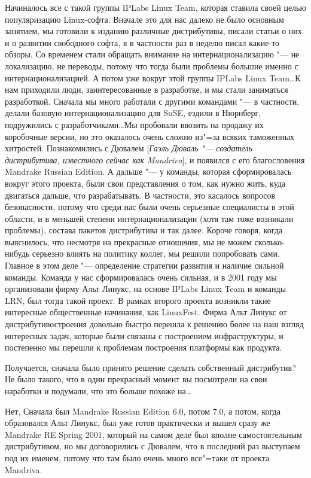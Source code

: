 \documentclass[10pt, a5paper]{article}
\begin{document}
\a Начиналось все с такой группы IPLabs Linux Team, которая ставила своей целью популяризацию Linux-софта. Вначале это для нас далеко не было основным занятием, мы готовили к изданию различные дистрибутивы, писали статьи о них и о развитии свободного софта, я в частности раз в неделю писал какие-то обзоры. Со временем стали обращать внимание на интернационализацию "--- не локализацию, не переводы, потому что тогда были проблемы большие именно с  интернационализацией. А потом уже вокруг этой группы  IPLabs Linux Team\ldots К нам приходили люди, заинтересованные в разработке, и мы стали заниматься разработкой. Сначала мы много работали с другими командами "--- в частности, делали базовую интернационализацию для SuSE, ездили в Нюрнберг, подружились с разработчиками\ldots Мы пробовали ввозить на продажу их коробочные версии, но это оказалось очень сложно из"=за всяких таможенных хитростей. Познакомились с Дювалем [\emph{Гаэль Дюваль "--- создатель дистрибутива, известного сейчас как Mandriva}], и появился с его благословения Mandrake Russian Edition. А дальше "--- у команды, которая сформировалась вокруг этого проекта, были свои представления о том, как нужно жить, куда двигаться дальше, что разрабатывать. В частности, это касалось вопросов безопасности, потому что среди нас были очень серьезные специалисты в этой области, и в меньшей степени интернационализации (хотя там тоже возникали проблемы),  состава пакетов дистрибутива и так далее. Короче говоря, когда выяснилось, что несмотря на прекрасные отношения, мы не можем сколько-нибудь серьезно влиять на политику коллег, мы решили попробовать сами. Главное в этом деле "--- определение стратегии развития и наличие сильной команды. Команда у нас сформировалась очень сильная, и в 2001 году мы организовали фирму Альт Линукс, на основе  IPLabs Linux Team и команды LRN, был тогда такой проект. В рамках второго проекта возникли такие интересные общественные начинания, как LinuxFest. Фирма Альт Линукс от дистрибутивостроения довольно быстро перешла к решению более на наш взгляд интересных задач, которые были связаны с построением инфраструктуры, и постепенно мы перешли к проблемам построения платформы как продукта. 

\q Получается, сначала было принято решение сделать собственный дистрибутив? Не было такого, что в один прекрасный момент вы посмотрели на свои наработки и подумали, что это больше похоже на\ldots

\a Нет, Сначала был  Mandrake Russian Edition 6.0, потом 7.0, а потом, когда образовался Альт Линукс, был уже готов практически и вышел сразу же Mandrake RE Spring 2001, который на самом деле был вполне самостоятельным дистрибутивом, но мы договорились с Дювалем, что в последний раз выступаем под их именем, потому что там было очень много все"=таки от проекта Mandriva. 
\end{document}
